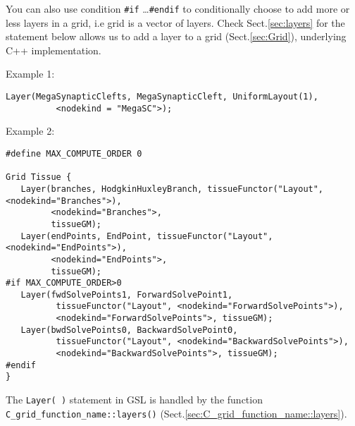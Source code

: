 You can also use condition \verb!#if! \ldots \verb!#endif! to  conditionally
choose to add more or less layers in a grid, i.e grid is a vector of layers.
Check Sect.\ref{sec:layers} for the  statement below allows us to add a layer
to a grid (Sect.\ref{sec:Grid}), underlying C++ implementation.

Example 1:
\begin{verbatim}
Layer(MegaSynapticClefts, MegaSynapticCleft, UniformLayout(1), 
          <nodekind = "MegaSC">);
\end{verbatim}

Example 2:
{\small
\begin{verbatim}
#define MAX_COMPUTE_ORDER 0

Grid Tissue {
   Layer(branches, HodgkinHuxleyBranch, tissueFunctor("Layout", <nodekind="Branches">), 
         <nodekind="Branches">, 
         tissueGM);
   Layer(endPoints, EndPoint, tissueFunctor("Layout", <nodekind="EndPoints">), 
         <nodekind="EndPoints">, 
         tissueGM);
#if MAX_COMPUTE_ORDER>0
   Layer(fwdSolvePoints1, ForwardSolvePoint1, 
          tissueFunctor("Layout", <nodekind="ForwardSolvePoints">), 
          <nodekind="ForwardSolvePoints">, tissueGM);
   Layer(bwdSolvePoints0, BackwardSolvePoint0, 
          tissueFunctor("Layout", <nodekind="BackwardSolvePoints">), 
          <nodekind="BackwardSolvePoints">, tissueGM);
#endif
}
\end{verbatim}
}

The \verb!Layer( )! statement in GSL is handled by the function
\verb!C_grid_function_name::layers()! (Sect.\ref{sec:C_grid_function_name::layers}).

